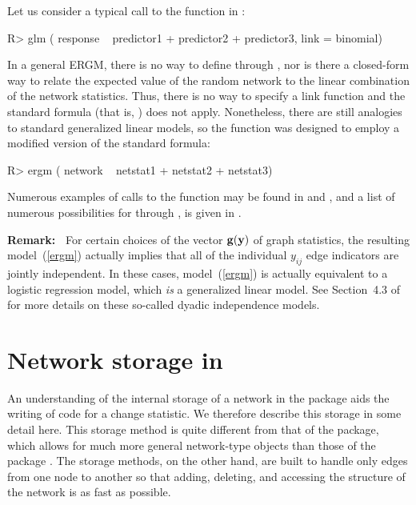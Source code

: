 \documentclass[nojss]{jss}
\def\vec#1{\mathchoice{\mbox{\boldmath$\displaystyle\bf#1$}}
{\mbox{\boldmath$\textstyle\bf#1$}}
{\mbox{\boldmath$\scriptstyle\bf#1$}}
{\mbox{\boldmath$\scriptscriptstyle\bf#1$}}}
\begin{document}
Let us consider a typical call to the  function in :
\begin{CodeChunk}
\begin{CodeInput}
R> glm ( response ~ predictor1 + predictor2 + predictor3, link = binomial)
\end{CodeInput}
\end{CodeChunk}
In a general ERGM, there
is no way to define  through ,
nor is there a closed-form way to relate the expected value of the random
network to the linear combination of the network statistics.  Thus, there is
no way to specify a link function and the standard  formula
(that is, ) does not apply.  Nonetheless, there
are still analogies to standard generalized linear models, so the
 function was designed to employ a modified version of the
standard  formula:
\begin{CodeChunk}
\begin{CodeInput}
R> ergm ( network ~ netstat1 + netstat2 + netstat3)
\end{CodeInput}
\end{CodeChunk}
Numerous examples of calls to the  function may be found in
\citet{ergmjss} and \citet{statnettutorialjss}, and a list of numerous possibilities
for  through , is given in \citet{ergmtermsjss}.

{\bf Remark:\ }
For certain choices of the vector $\vec g(\vec y)$ of graph statistics, the resulting
model~(\ref{ergm}) actually implies that all of the individual $y_{ij}$ edge indicators
are jointly independent.  In these cases, model~(\ref{ergm}) is actually equivalent
to a logistic regression model, which {\em is} a generalized linear model.
See Section~4.3 of \cite{ergmjss} for more details on these so-called
dyadic independence models.

\section[Network storage in ergm]{Network storage in }
\label{networkstorage}

An understanding of the internal storage of a network in the  package
aids the writing of code for a change statistic. We therefore
describe this storage in some detail here.
This storage method is quite different from that of the  package,
which allows for much more general network-type objects
than those of the  package \citep{networkjss}.
The  storage methods, on the other hand, are built to
handle only edges from one node to another
so that adding, deleting, and accessing the structure of the network is as
fast as possible.
\end{document}
